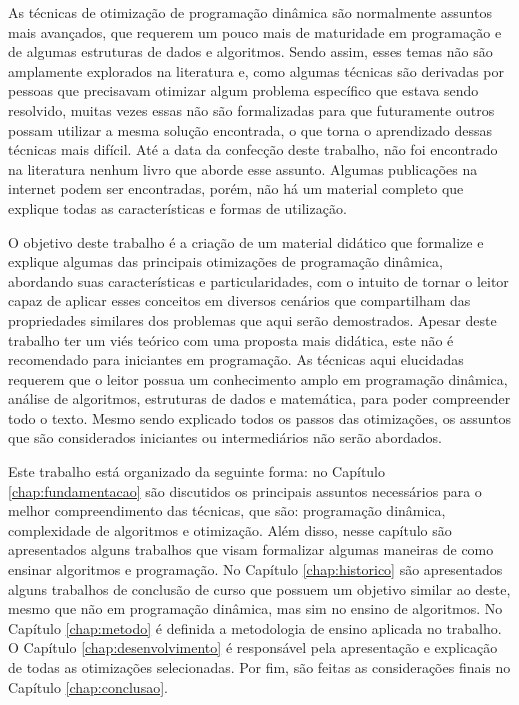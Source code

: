 As técnicas de otimização de programação dinâmica são normalmente assuntos mais avançados, que requerem um pouco mais de maturidade em programação e de algumas estruturas de dados e algoritmos. Sendo assim, esses temas não são amplamente explorados na literatura e, como algumas técnicas são derivadas por pessoas que precisavam otimizar algum problema específico que estava sendo resolvido, muitas vezes essas não são formalizadas para que futuramente outros possam utilizar a mesma solução encontrada, o que torna o aprendizado dessas técnicas mais difícil. Até a data da confecção deste trabalho, não foi encontrado na literatura nenhum livro que aborde esse assunto. Algumas publicações na internet podem ser encontradas, porém, não há um material completo que explique todas as características e formas de utilização.

O objetivo deste trabalho é a criação de um material didático que formalize e explique algumas das principais otimizações de programação dinâmica, abordando suas características e particularidades, com o intuito de tornar o leitor capaz de aplicar esses conceitos em diversos cenários que compartilham das propriedades similares dos problemas que aqui serão demostrados. Apesar deste trabalho ter um viés teórico com uma proposta mais didática, este não é recomendado para iniciantes em programação. As técnicas aqui elucidadas requerem que o leitor possua um conhecimento amplo em programação dinâmica, análise de algoritmos, estruturas de dados e matemática, para poder compreender todo o texto. Mesmo sendo explicado todos os passos das otimizações, os assuntos que são considerados iniciantes ou intermediários não serão abordados.

Este trabalho está organizado da seguinte forma: no Capítulo \ref{chap:fundamentacao} são discutidos os principais assuntos necessários para o melhor compreendimento das técnicas, que são: programação dinâmica, complexidade de algoritmos e otimização. Além disso, nesse capítulo são apresentados alguns trabalhos que visam formalizar algumas maneiras de como ensinar algoritmos e programação. No Capítulo \ref{chap:historico} são apresentados alguns trabalhos de conclusão de curso que possuem um objetivo similar ao deste, mesmo que não em programação dinâmica, mas sim no ensino de algoritmos. No Capítulo \ref{chap:metodo} é definida a metodologia de ensino aplicada no trabalho. O Capítulo \ref{chap:desenvolvimento} é responsável pela apresentação e explicação de todas as otimizações selecionadas. Por fim, são feitas as considerações finais no Capítulo \ref{chap:conclusao}.

